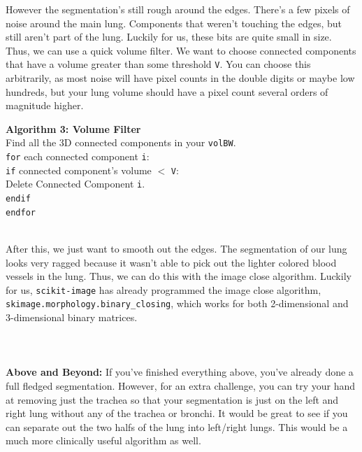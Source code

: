 \documentclass[10pt]{article}
\begin{document}
\indent However the segmentation's still rough around the edges.  There's a few pixels of noise around the main lung.  Components that weren't touching the edges, but still aren't part of the lung.  Luckily for us, these bits are quite small in size.  Thus, we can use a quick volume filter.  We want to choose connected components that have a volume greater than some threshold \texttt{V}.  You can choose this arbitrarily, as most noise will have pixel counts in the double digits or maybe low hundreds, but your lung volume should have a pixel count several orders of magnitude higher.
\begin{center}
\begin{minipage}[c]{0.75\textwidth}
\noindent\makebox[\linewidth]{\rule{\textwidth}{0.4pt}}
\noindent \textbf{Algorithm 3: Volume Filter}\\
\noindent\makebox[\linewidth]{\rule{\textwidth}{0.2pt}}
Find all the 3D connected components in your \texttt{volBW}.\\
\texttt{for} each connected component \texttt{i}:\\
\hspace*{1em} \texttt{if} connected component's volume $<$ \texttt{V}:\\
\hspace*{2em} Delete Connected Component \texttt{i}.\\
\hspace*{1em} \texttt{endif}\\
\texttt{endfor}\\
\noindent\makebox[\linewidth]{\rule{\textwidth}{0.2pt}}
\end{minipage}
\end{center}
\ \\
\indent After this, we just want to smooth out the edges.  The segmentation of our lung looks very ragged because it wasn't able to pick out the lighter colored blood vessels in the lung.  Thus, we can do this with the image close algorithm.  Luckily for us, \texttt{scikit-image} has already programmed the image close algorithm, \texttt{skimage.morphology.binary\_closing}, which works for both 2-dimensional and 3-dimensional binary matrices.
\ \\
\ \\
\ \\
\ \\
\textbf{Above and Beyond:}  If you've finished everything above, you've already done a full fledged segmentation.  However, for an extra challenge, you can try your hand at removing just the trachea so that your segmentation is just on the left and right lung without any of the trachea or bronchi.  It would be great to see if you can separate out the two halfs of the lung into left/right lungs.  This would be a much more clinically useful algorithm as well.
\end{document}
